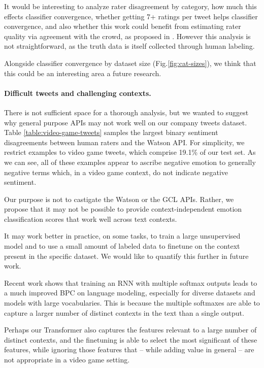 \documentclass[letterpaper]{article} %
\begin{document}
It would be interesting to analyze rater disagreement by category, how much this effects classifier convergence, whether getting 7+ ratings per tweet helps classifier convergence, and also whether this work could benefit from estimating rater quality via agreement with the crowd, as proposed in \cite{NoisyLabelHumanAWS2017}. However this analysis is not straightforward, as the truth data is itself collected through human labeling.

Alongside classifier convergence by dataset size (Fig.\ref{fig:cat-sizes}), we think that this could be an interesting area a future research.


\paragraph{Difficult tweets and challenging contexts.}
There is not sufficient space for a thorough analysis, but we wanted to suggest why general purpose APIs may not work well on our company tweets dataset. Table \ref{table:video-game-tweets} samples the largest binary sentiment disagreements between human raters and the Watson API. For simplicity, we restrict examples to video game tweets, which comprise 19.1\% of our test set. As we can see, all of these examples appear to ascribe negative emotion to generally negative terms which, in a video game context, do not indicate negative sentiment.

Our purpose is not to castigate the Watson or the GCL APIs. Rather, we propose that it may not be possible to provide context-independent emotion classification scores that work well across text contexts.

It may work better in practice, on some tasks, to train a large unsupervised model and to use a small amount of labeled data to finetune on the context present in the specific dataset. We would like to quantify this further in future work.

Recent work \cite{SoftmaxBottleneck2017} shows that training an RNN with multiple softmax outputs leads to a much improved BPC on language modeling, especially for diverse datasets and models with large vocabularies. This is because the multiple softmaxes are able to capture a larger number of distinct contexts in the text than a single output.

Perhaps our Transformer also captures the features relevant to a large number of distinct contexts, and the finetuning is able to select the most significant of these features, while ignoring those features that -- while adding value in general -- are not appropriate in a video game setting.
\end{document}
